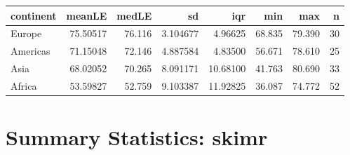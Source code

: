 \documentclass[
]{book}
\newenvironment{Shaded}{\begin{snugshade}}{\end{snugshade}}
\newcommand{\CommentTok}[1]{\textcolor[rgb]{0.56,0.35,0.01}{\textit{#1}}}
\newcommand{\DataTypeTok}[1]{\textcolor[rgb]{0.13,0.29,0.53}{#1}}
\newcommand{\DecValTok}[1]{\textcolor[rgb]{0.00,0.00,0.81}{#1}}
\newcommand{\KeywordTok}[1]{\textcolor[rgb]{0.13,0.29,0.53}{\textbf{#1}}}
\newcommand{\NormalTok}[1]{#1}
\newcommand{\OperatorTok}[1]{\textcolor[rgb]{0.81,0.36,0.00}{\textbf{#1}}}
\newcommand{\OtherTok}[1]{\textcolor[rgb]{0.56,0.35,0.01}{#1}}
\newcommand{\StringTok}[1]{\textcolor[rgb]{0.31,0.60,0.02}{#1}}
\begin{document}
\begin{Shaded}
\end{Shaded}

\begin{tabular}{l|r|r|r|r|r|r|r}
\hline
continent & meanLE & medLE & sd & iqr & min & max & n\\
\hline
Europe & 75.50517 & 76.116 & 3.104677 & 4.96625 & 68.835 & 79.390 & 30\\
\hline
Americas & 71.15048 & 72.146 & 4.887584 & 4.83500 & 56.671 & 78.610 & 25\\
\hline
Asia & 68.02052 & 70.265 & 8.091171 & 10.68100 & 41.763 & 80.690 & 33\\
\hline
Africa & 53.59827 & 52.759 & 9.103387 & 11.92825 & 36.087 & 74.772 & 52\\
\hline
\end{tabular}

\hypertarget{summary-statistics-skimr}{%
\section{Summary Statistics: skimr}\label{summary-statistics-skimr}}
\end{document}
